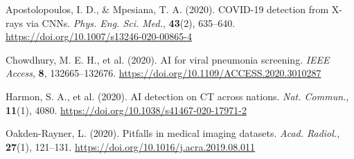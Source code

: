 \documentclass[10pt, a4paper]{article}
\begin{document}
\begin{thebibliography}{99} %

Apostolopoulos, I. D., \& Mpesiana, T. A. (2020). COVID-19 detection from X-rays via CNNs. \textit{Phys. Eng. Sci. Med.}, \textbf{43}(2), 635--640. \url{https://doi.org/10.1007/s13246-020-00865-4}

Chowdhury, M. E. H., et al. (2020). AI for viral pneumonia screening. \textit{IEEE Access}, \textbf{8}, 132665--132676. \url{https://doi.org/10.1109/ACCESS.2020.3010287}

Harmon, S. A., et al. (2020). AI detection on CT across nations. \textit{Nat. Commun.}, \textbf{11}(1), 4080. \url{https://doi.org/10.1038/s41467-020-17971-2}

Oakden-Rayner, L. (2020). Pitfalls in medical imaging datasets. \textit{Acad. Radiol.}, \textbf{27}(1), 121--131. \url{https://doi.org/10.1016/j.acra.2019.08.011}

\end{thebibliography}
\end{document}
